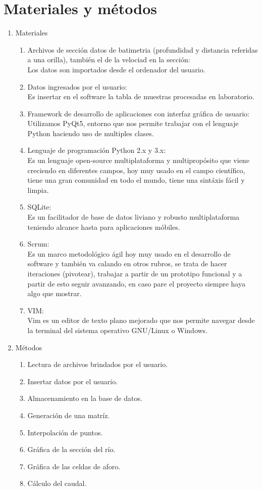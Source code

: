 \documentclass[a4paper,openright,12pt]{report}
\begin{document}
\section{Materiales y m\'etodos}
\begin{enumerate}
\item Materiales
	\begin{enumerate}
	\item Archivos de secci\'on datos de batimetria (profundidad y distancia referidas a una orilla), tambi\'en el de la velociad en la sección: \\
	Los datos son importados desde el ordenador del usuario.
	\item Datos ingresados por el usuario: \\
	Es insertar en el software la tabla de muestras procesadas en laboratorio.
	\item Framework de desarrollo de aplicaciones con interfaz gr\'afica de usuario: \\
	Utilizamos PyQt5, entorno que nos permite trabajar con el lenguaje Python haciendo uso de multiples clases.
	\item Lenguaje de programaci\'on Python 2.x y 3.x: \\
	Es un lenguaje open-source multiplataforma y multiprop\'osito que viene creciendo en diferentes campos, hoy muy usado en el campo cient\'ifico, tiene una gran comunidad en todo el mundo, tiene una sint\'axis f\'acil y limpia.
	\item SQLite: \\
	Es un facilitador de base de datos liviano y robusto multiplataforma teniendo alcance hasta para aplicaciones móbiles.
	\item Scrum: \\
	Es un marco metodol\'ogico \'agil hoy muy usado en el desarrollo de software y tambi\'en va calando en otros rubros, se trata de hacer iteraciones (pivotear), trabajar a partir de un prototipo funcional y a partir de esto seguir avanzando, en caso pare el proyecto siempre haya algo que mostrar.
	\item VIM: \\
	Vim es un editor de texto plano mejorado que nos permite navegar desde la terminal del sistema operativo GNU/Linux o Windows.
	\end{enumerate}
\item M\'etodos
	\begin{enumerate}
	\item Lectura de archivos brindados por el usuario.
	\item Insertar datos por el usuario.
	\item Almacenamiento en la base de datos.
	\item Generaci\'on de una matr\'iz.
	\item Interpolaci\'on de puntos.
	\item Gr\'afica de la secci\'on del r\'io.
	\item Gr\'afica de las celdas de aforo.
	\item C\'alculo del caudal.
	\end{enumerate}
\end{enumerate}
\end{document}
